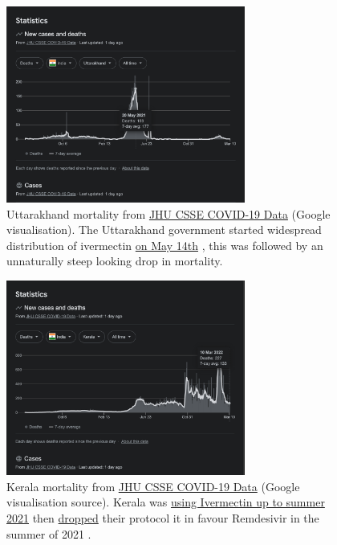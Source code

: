 \documentclass[11pt,a4paper,notitlepage]{report}
\begin{document}
\begin{figure}[h]
    \centering
    \includegraphics[width=0.7\textwidth]{india-uttarakhand-mortality}
    \caption{Uttarakhand mortality from \href{https://github.com/CSSEGISandData/COVID-19}{JHU CSSE COVID-19 Data} (Google visualisation). The Uttarakhand government started widespread distribution of ivermectin \href{https://economictimes.indiatimes.com/news/india/covid-19-ivermectin-tablets-to-be-distributed-among-uttarakhand-residents-says-state-govt/articleshow/82572159.cms}{on May 14th} \cite{economictimes12052021}, this was followed by an unnaturally steep looking drop in mortality.}
    \label{fig:india-uttarakhand-mortality}
\end{figure}

\begin{figure}[h]
    \centering
    \includegraphics[width=0.7\textwidth]{india-kerala-mortality}
    \caption{Kerala mortality from \href{https://github.com/CSSEGISandData/COVID-19}{JHU CSSE COVID-19 Data} (Google visualisation source). Kerala was \href{https://dhs.kerala.gov.in/wp-content/uploads/2021/04/Kerala-State-COVID-19-guidelines-Version-3.pdf}{using Ivermectin up to summer 2021} \cite{keralagov24042021} then \href{https://www.thehindu.com/news/national/kerala/kerala-revises-covid-19-treatment-guidelines/article35775373.ece}{dropped} their protocol it in favour Remdesivir in the summer of 2021 \cite{hindu06082021}.}
    \label{fig:india-kerala-mortality}
\end{figure}
\end{document}
